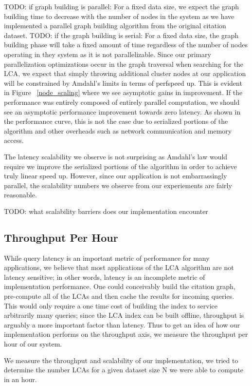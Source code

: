 \documentclass{article}
\begin{document}
TODO: if graph building is parallel: For a fixed data size, we expect the graph building time to decrease with the number of nodes in the system as we have implemented a parallel graph building algorithm from the original citation dataset.
TODO: if the graph building is serial: For a fixed data size, the graph building phase will take a fixed amount of time regardless of the number of nodes operating in they system as it is not parallelizable.
Since our primary parallelization optimizations occur in the graph traversal when searching for the LCA, we expect that simply throwing additional cluster nodes at our application will be constrained by Amdahl's limits in terms of  perfspeed up.
This is evident in Figure ~\ref{node_scaling} where we see asymptotic gains in improvement. 
If the performance was entirely composed of entirely parallel computation, we should see an asymptotic performance improvement towards zero latency.
As shown in the performance curve, this is not the case due to serialized portions of the algorithm and other overheads such as network communication and memory access.

The latency scalability we observe is not surprising as Amdahl's law would require we improve the serialized portions of the algorithm in order to achieve truly linear speed up.
However, since our application is not embarrassingly parallel, the scalability numbers we observe from our experiements are fairly reasonable.

TODO: what scalability barriers does our implementation encounter

\subsection{Throughput Per Hour}

While query latency is an important metric of performance for many applications, we believe that most applications of the LCA algorithm are not latency sensitive; in other words, latency is an incomplete metric of implementation performance.
One could conceivably build the citation graph, pre-compute all of the LCAs and then cache the results for incoming queries.
This would only require a one time cost of building the index to service arbitrarily many queries; since the LCA index can be built offline, throughput is arguably a more important factor than latency.
Thus to get an idea of how our implementation performs on the throughput axis, we measure the throughput per hour of our system.

We measure the throughput and scalability of our implementation, we tried to determine the number LCAs for a given dataset size N we were able to compute in an hour.
\end{document}
